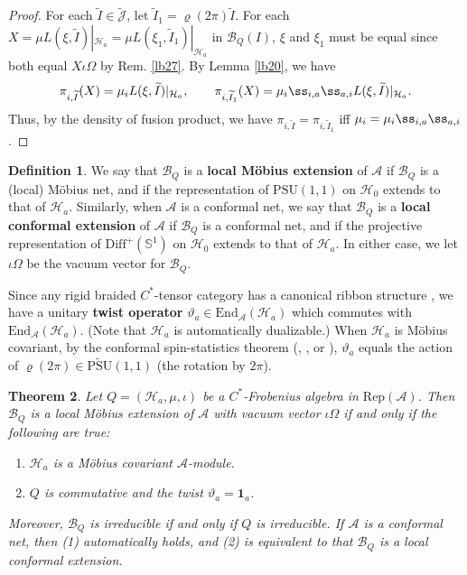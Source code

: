\documentclass[11pt,b5paper,notitlepage]{article}
\theoremstyle{definition}
\newtheorem{df}{Definition}[section]
\theoremstyle{plain}
\newtheorem{thm}[df]{Theorem}
\newcommand{\mc}{\mathcal}
\newcommand{\wtd}{\widetilde}
\newcommand{\End}{\mathrm{End}} %
\newcommand{\id}{\mathbf{1}}
\newcommand{\Diffp}{\mathrm{Diff}^+}
\newcommand{\PSU}{\mathrm{PSU}(1,1)}
\newcommand{\Jtd}{\widetilde{\mathcal J}}
\newcommand{\RepA}{\mathrm{Rep}(\mathcal A)}
\newcommand{\UPSU}{\widetilde{\mathrm{PSU}}(1,1)}
\newcommand{\Sbb}{{\mathbb S}}
\numberwithin{equation}{section}
\begin{document}
\begin{proof}
For each $\wtd I\in\Jtd$, let $\wtd I_1=\varrho(2\pi)\wtd I$. For each  $X=\mu L(\xi,\wtd I)|_{\mc H_a}=\mu L(\xi_1,\wtd I_1)|_{\mc H_a}$ in $\mc B_Q(I)$,  $\xi$ and $\xi_1$ must be equal since both equal $X\iota\Omega$ by Rem. \ref{lb27}. By Lemma \ref{lb20}, we have
\begin{gather*}
\pi_{i,\wtd I}(X)=\mu_i L(\xi,\wtd I)|_{\mc H_a},\qquad \pi_{i,\wtd I_1}(X)=\mu_i\ss_{i,a}\ss_{a,i}  L(\xi,\wtd I)|_{\mc H_a}.	
\end{gather*}
Thus, by the density of fusion product, we have $\pi_{i,\wtd I}=\pi_{i,\wtd I_1}$ iff $\mu_i=\mu_i\ss_{i,a}\ss_{a,i}$.
\end{proof}


\begin{df}
We say that $\mc B_Q$ is a \textbf{local M\"obius extension} of $\mc A$ if $\mc B_Q$ is a (local) M\"obius net, and if the representation of $\PSU$ on $\mc H_0$ extends to that of $\mc H_a$. Similarly, when $\mc A$ is a conformal net, we say that $\mc B_Q$ is a \textbf{local conformal extension} of $\mc A$ if $\mc B_Q$ is a conformal net, and if the projective representation of $\Diffp(\Sbb^1)$ on $\mc H_0$ extends to that of $\mc H_a$. In either case, we let $\iota\Omega$ be the vacuum vector for $\mc B_Q$.
\end{df}


Since any rigid braided $C^*$-tensor category has a canonical ribbon structure \cite{Mug00}, we have a unitary \textbf{twist operator} $\vartheta_a\in\End_{\mc A}(\mc H_a)$ which commutes with $\End_{\mc A}(\mc H_a)$. (Note that $\mc H_a$ is automatically dualizable.) When $\mc H_a$ is M\"obius covariant, by the conformal spin-statistics theorem (\cite[Thm. 3.13]{GL96}, \cite[Sec. 4.1]{Jor96}, or \cite[Thm. 6.8]{Gui21b}), $\vartheta_a$ equals the action of $\varrho(2\pi)\in\UPSU$ (the rotation by $2\pi$).







\begin{thm}\label{lb25}
Let $Q=(\mc H_a,\mu,\iota)$ be a $C^*$-Frobenius algebra in $\RepA$. Then $\mc B_Q$ is a local M\"obius extension of $\mc A$ with vacuum vector $\iota\Omega$ if and only if the following are true:
\begin{enumerate}[label=(\arabic*)]
\item $\mc H_a$ is a M\"obius covariant $\mc A$-module.
\item $Q$ is commutative and the twist $\vartheta_a=\id_a$.
\end{enumerate}
Moreover, $\mc B_Q$ is irreducible if and only if $Q$ is irreducible. If $\mc A$ is a conformal net, then (1) automatically holds, and (2) is equivalent to that $\mc B_Q$ is a local conformal extension.
\end{thm}
\end{document}
